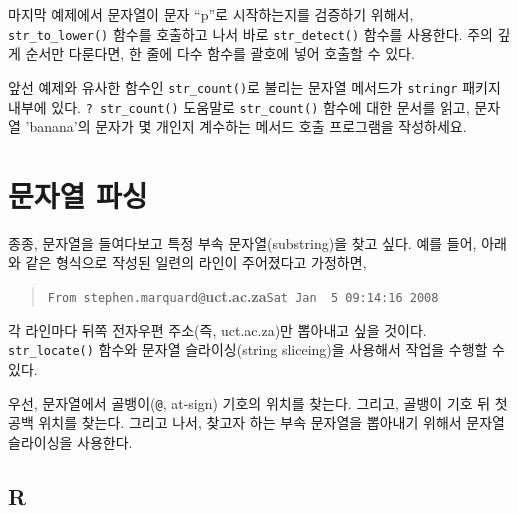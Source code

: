 \documentclass[
  letterpaper,
]{book}
\begin{document}
마지막 예제에서 문자열이 문자 ``p''로 시작하는지를 검증하기 위해서,
\texttt{str\_to\_lower()} 함수를 호출하고 나서 바로
\texttt{str\_detect()} 함수를 사용한다. 주의 깊게 순서만 다룬다면, 한
줄에 다수 함수를 괄호에 넣어 호출할 수 있다.

\begin{tcolorbox}[enhanced jigsaw, coltitle=black, breakable, opacityback=0, colback=white, bottomtitle=1mm, titlerule=0mm, toptitle=1mm, title=\textcolor{quarto-callout-warning-color}{\faExclamationTriangle}\hspace{0.5em}{연습문제}, left=2mm, rightrule=.15mm, colframe=quarto-callout-warning-color-frame, bottomrule=.15mm, leftrule=.75mm, toprule=.15mm, arc=.35mm, colbacktitle=quarto-callout-warning-color!10!white, opacitybacktitle=0.6]

앞선 예제와 유사한 함수인 \texttt{str\_count()}로 불리는 문자열 메서드가
\texttt{stringr} 패키지 내부에 있다. \texttt{?\ str\_count()} 도움말로
\texttt{str\_count()} 함수에 대한 문서를 읽고, 문자열 'banana'의 문자가
몇 개인지 계수하는 메서드 호출 프로그램을 작성하세요.

\end{tcolorbox}

\section{문자열 파싱}\label{r-string-parsing}

종종, 문자열을 들여다보고 특정 부속 문자열(substring)을 찾고 싶다. 예를
들어, 아래와 같은 형식으로 작성된 일련의 라인이 주어졌다고 가정하면,

\begin{quote}
\texttt{From\ stephen.marquard@}\textbf{uct.ac.za}\texttt{Sat\ Jan\ \ 5\ 09:14:16\ 2008}
\end{quote}

각 라인마다 뒤쪽 전자우편 주소(즉, uct.ac.za)만 뽑아내고 싶을 것이다.
\texttt{str\_locate()} 함수와 문자열 슬라이싱(string sliceing)을
사용해서 작업을 수행할 수 있다.

우선, 문자열에서 골뱅이(\texttt{@}, at-sign) 기호의 위치를 찾는다.
그리고, 골뱅이 기호 뒤 첫 공백 위치를 찾는다. 그리고 나서, 찾고자 하는
부속 문자열을 뽑아내기 위해서 문자열 슬라이싱을 사용한다.

\subsection{R}
\end{document}
